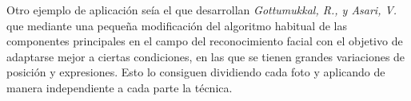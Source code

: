 \noindent Otro ejemplo de aplicación seía el que desarrollan \emph{Gottumukkal, R., y Asari, V.} \cite {Asari 2004} que mediante una pequeña modificación del algoritmo habitual de las componentes principales en el campo del reconocimiento facial con el objetivo de adaptarse mejor a ciertas condiciones, en las que se tienen grandes variaciones de posición y expresiones. Esto lo consiguen dividiendo cada foto y aplicando de manera independiente a cada parte la técnica. 

